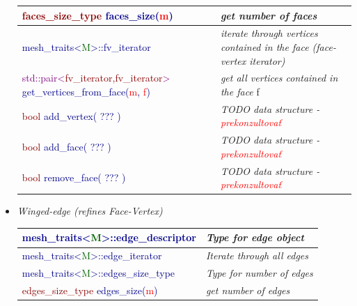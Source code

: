 \documentclass{article}
\begin{document}
\begin{itemize}
\begin{table}[0.8\textwidth]
\begin{tabular}{|p{} | p{} |}
\textsf{\textcolor{darkred}{faces\_size\_type}} \textsf{\textcolor{darkblue}{faces\_size(\textcolor{red}{m})}} & \emph{get number of faces} \\ \hline

\textsf{\textcolor{darkblue}{mesh\_traits\textless\textcolor{darkgreen}{M}\textgreater ::fv\_iterator}} & \emph{iterate through vertices contained in the face (face-vertex iterator)} \\ \hline

\textsf{\textcolor{purple}{std::pair\textless\textcolor{darkred}{fv\_iterator,fv\_iterator}\textgreater}\, \hspace*{2.5px} \textcolor{darkblue}{get\_vertices\_from\_face(\textcolor{red}{m}, \textcolor{red}{f})}} &  \emph{get all vertices contained in the face} \textsf{f} \\ \hline

\textsf{\textcolor{darkred}{bool} \textcolor{darkblue}{add\_vertex( ??? )}} & \emph{TODO data structure - \textcolor{red}{prekonzultovať}} \\ \hline
\textsf{\textcolor{darkred}{bool} \textcolor{darkblue}{add\_face( ??? )}} & \emph{TODO data structure - \textcolor{red}{prekonzultovať}} \\ \hline
\textsf{\textcolor{darkred}{bool} \textcolor{darkblue}{remove\_face( ??? )}} & \emph{TODO data structure - \textcolor{red}{prekonzultovať}} \\ \hline


\end{tabular}
\end{table}
\newpage
\item \emph{Winged-edge (refines Face-Vertex)}
\begin{table}[!h]
\begin{tabular}{| p{} | p{} |}
\hline
\textsf{\textcolor{darkblue}{mesh\_traits\textless\textcolor{darkgreen}{M}\textgreater ::edge\_descriptor}} & \emph{Type for edge object}\\ \hline

\textsf{\textcolor{darkblue}{mesh\_traits\textless\textcolor{darkgreen}{M}\textgreater ::edge\_iterator}} & \emph{Iterate through all edges}\\ \hline

\textsf{\textcolor{darkblue}{mesh\_traits\textless\textcolor{darkgreen}{M}\textgreater ::edges\_size\_type}} & \emph{Type for number of edges}\\ \hline

\textsf{\textcolor{darkred}{edges\_size\_type}} \textsf{\textcolor{darkblue}{edges\_size(\textcolor{red}{m})}} & \emph{get number of edges}\\ \hline


\end{tabular}
\end{table}
\end{itemize}
\end{document}
